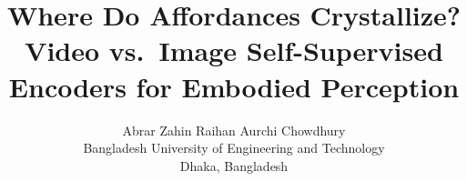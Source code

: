 \documentclass[10pt,twocolumn,letterpaper]{article}
\title{Where Do Affordances Crystallize?\\
Video vs.\ Image Self-Supervised Encoders for Embodied Perception}
\author{Abrar Zahin Raihan \quad Aurchi Chowdhury\\
Bangladesh University of Engineering and Technology\\
Dhaka, Bangladesh
}
\begin{document}
\maketitle







{
    \small
    
    
}
\end{document}
